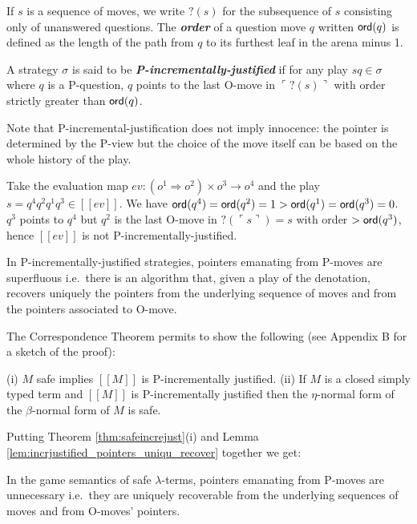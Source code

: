 \documentclass{llncs}
\newcommand\defname[1]{{\bf\em #1}\index{#1}}
\newcommand\ord[1]{{\sf ord}(#1)}
\newcommand{\sem}[1]{{[\![ #1 ]\!]}}
\newcommand{\pview}[1]{\ulcorner #1 \urcorner}
\begin{document}
If $s$ is a sequence of moves, we write $?(s)$ for the subsequence of $s$ consisting only of unanswered questions. The \defname{order} of
a question move $q$ written $\ord{q}$ is defined as the length of the path from $q$ to its furthest leaf in the arena minus 1.

\begin{definition}
A strategy $\sigma$ is said to be \defname{P-incrementally-justified}
if for any play $s q \in \sigma$ where $q$ is a P-question,
$q$ points to the last O-move in $\pview{?(s)}$ with order strictly greater than $\ord{q}$.
\end{definition}
Note that P-incremental-justification does not imply innocence: the pointer is determined by the P-view but the choice of the move itself can be based on the whole history of the play.
\begin{example}
Take the evaluation map $ev : (o^1 \Rightarrow o^2) \times  o^3 \rightarrow o^4$ and
the play $s = q^4 q^2 q^1 q^3 \in \sem{ev}$. We have $\ord{q^4} = \ord{q^2} = 1 > \ord{q^1} = \ord{q^3} = 0$.
$q^3$ points to $q^4$ but $q^2$ is the last O-move in $?(\pview{s})= s$
with order $>\ord{q^3}$, hence $\sem{ev}$ is not P-incrementally-justified.
\end{example}

\begin{lemma}
\label{lem:incrjustified_pointers_uniqu_recover} In P-incrementally-justified strategies, pointers emanating from P-moves are superfluous i.e.\ 
there is an algorithm that, given a play of the denotation, recovers uniquely the pointers from the underlying sequence of moves and from the pointers associated to O-move.
\end{lemma}


The Correspondence Theorem permits to show the following (see Appendix B for a sketch of the proof):

\begin{theorem}
\label{thm:safeincrejust}
(i) $M$ safe implies $\sem{M}$ is P-incrementally justified.
(ii) If $M$ is a closed simply typed term and $\sem{M}$ is P-incrementally justified then the $\eta$-normal form of the $\beta$-normal form  of $M$ is safe.
\end{theorem}



Putting Theorem \ref{thm:safeincrejust}(i)
and Lemma \ref{lem:incrjustified_pointers_uniqu_recover} together
we get:
\begin{proposition}
\label{prop:safe_ptr_recoverable} In the game semantics of
safe $\lambda$-terms, pointers emanating from P-moves are
unnecessary i.e.\ they are uniquely recoverable from the underlying sequences of moves and from O-moves' pointers.
\end{proposition}
\end{document}
